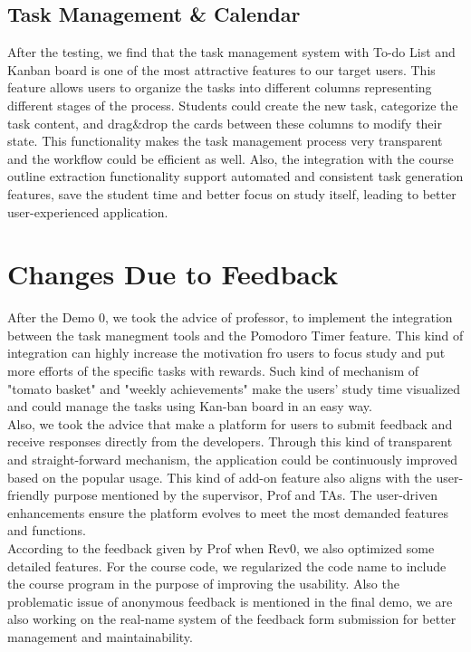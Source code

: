 \documentclass[12pt, titlepage]{article}
\begin{document}
 \subsection{Task Management \& Calendar} \label{TMCR}
  After the testing, we find that the task management system with To-do List and Kanban board is one  of the most attractive features to our target users. This feature allows users to organize the tasks into different columns representing different stages of the process. Students could create the new task, categorize the task content, and drag&drop the cards between these columns to modify their state. This functionality makes the task management process very transparent and the workflow could be efficient as well. Also, the integration with the course outline extraction functionality support  automated and consistent task generation features, save the student time and better focus on study itself, leading to better user-experienced application.
  
\section{Changes Due to Feedback}

After the Demo 0, we took the advice of professor, to implement the integration between the task manegment tools and the Pomodoro Timer feature. This kind of integration can highly increase the motivation fro users to focus study and put more efforts of the specific tasks with rewards. Such kind of mechanism of "tomato basket" and "weekly achievements" make the users' study time visualized and could manage the tasks using Kan-ban board in an easy way. \\

Also, we took the advice that make a platform for users to submit feedback and receive responses directly from the developers. Through this kind of transparent and straight-forward mechanism, the application could be continuously improved based on the popular usage. This kind of add-on feature also aligns with the user-friendly purpose mentioned by the supervisor, Prof and TAs.  The user-driven enhancements ensure the platform evolves to meet the most demanded features and functions.\\

According to the feedback given by Prof when Rev0, we also optimized some detailed features. For the course code, we regularized the code name to include the course program in the purpose of improving the usability. Also the problematic issue of anonymous feedback is mentioned in the final demo, we are also working on the real-name system of the feedback form submission for better management and maintainability.
\end{document}
